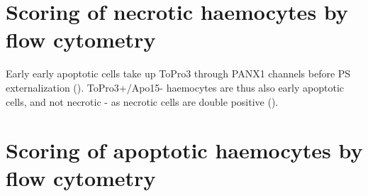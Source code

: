 \section{Scoring of necrotic haemocytes by flow cytometry}

Early early apoptotic cells take up ToPro3 through PANX1 channels before PS externalization (\cite{Poon2014}). ToPro3+/Apo15- haemocytes are thus also early apoptotic cells, and not necrotic - as necrotic cells are double positive (\cite{Jiang2016, Feng2021}).




\section{Scoring of apoptotic haemocytes by flow cytometry}
